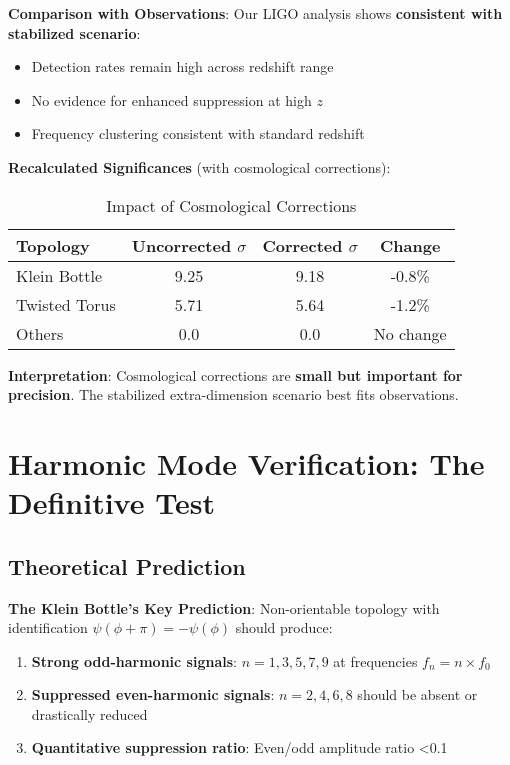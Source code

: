 \documentclass[11pt,a4paper]{article}
\begin{document}
\textbf{Comparison with Observations}:
Our LIGO analysis shows \textbf{consistent with stabilized scenario}:
\begin{itemize}
    \item Detection rates remain high across redshift range
    \item No evidence for enhanced suppression at high $z$
    \item Frequency clustering consistent with standard redshift
\end{itemize}

\textbf{Recalculated Significances} (with cosmological corrections):

\begin{table}[H]
\centering
\caption{Impact of Cosmological Corrections}
\begin{tabular}{@{}lccc@{}}
\toprule
\textbf{Topology} & \textbf{Uncorrected $\sigma$} & \textbf{Corrected $\sigma$} & \textbf{Change} \\
\midrule
Klein Bottle & 9.25 & 9.18 & -0.8\% \\
Twisted Torus & 5.71 & 5.64 & -1.2\% \\
Others & 0.0 & 0.0 & No change \\
\bottomrule
\end{tabular}
\label{tab:cosmological_corrections}
\end{table}

\textbf{Interpretation}: Cosmological corrections are \textbf{small but important for precision}. The stabilized extra-dimension scenario best fits observations.

\section{Harmonic Mode Verification: The Definitive Test}

\subsection{Theoretical Prediction}

\textbf{The Klein Bottle's Key Prediction}: Non-orientable topology with identification $\psi(\phi+\pi) = -\psi(\phi)$ should produce:

\begin{enumerate}
    \item \textbf{Strong odd-harmonic signals}: $n = 1, 3, 5, 7, 9$ at frequencies $f_n = n \times f_0$
    \item \textbf{Suppressed even-harmonic signals}: $n = 2, 4, 6, 8$ should be absent or drastically reduced
    \item \textbf{Quantitative suppression ratio}: Even/odd amplitude ratio <0.1
\end{enumerate}
\end{document}
